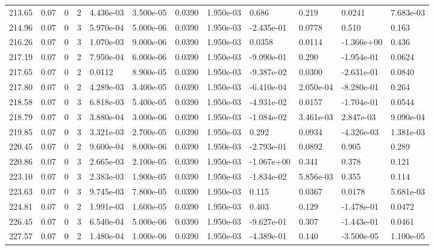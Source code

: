 \documentclass[preview]{standalone}
\begin{document}
{{{{{{{{\begin{tabular}{L{1.2cm}C{1.2cm} C{0.3cm}C{0.5cm} C{1.4cm}C{1.4cm} C{1.4cm}C{1.4cm} C{1.6cm}C{1.6cm} C{1.6cm}C{1.6cm}}
  213.65  &  0.07  & 0     &  2 &  4.436e-03  & 3.500e-05  &  0.0390&   1.950e-03& 0.686 & 0.219   &  0.0241 & 7.683e-03  \\ 
  214.96  &  0.07  & 0     &  3 &  5.970e-04  & 5.000e-06  &  0.0390&   1.950e-03& -2.435e-01 & 0.0778   &  0.510 & 0.163  \\ 
  216.26  &  0.07  & 0     &  3 &  1.070e-03  & 9.000e-06  &  0.0390&   1.950e-03& 0.0358 & 0.0114   &  -1.366e+00 & 0.436  \\ 
  217.19  &  0.07  & 0     &  2 &  7.950e-04  & 6.000e-06  &  0.0390&   1.950e-03& -9.090e-01 & 0.290   &  -1.954e-01 & 0.0624  \\ 
  217.65  &  0.07  & 0     &  2 &  0.0112  & 8.900e-05  &  0.0390&   1.950e-03& -9.387e-02 & 0.0300   &  -2.631e-01 & 0.0840  \\ 
  217.80  &  0.07  & 0     &  2 &  4.289e-03  & 3.400e-05  &  0.0390&   1.950e-03& -6.410e-04 & 2.050e-04   &  -8.280e-01 & 0.264  \\ 
  218.58  &  0.07  & 0     &  3 &  6.818e-03  & 5.400e-05  &  0.0390&   1.950e-03& -4.931e-02 & 0.0157   &  -1.704e-01 & 0.0544  \\ 
  218.79  &  0.07  & 0     &  3 &  3.880e-04  & 3.000e-06  &  0.0390&   1.950e-03& -1.084e-02 & 3.461e-03   &  2.847e-03 & 9.090e-04  \\ 
  219.85  &  0.07  & 0     &  3 &  3.321e-03  & 2.700e-05  &  0.0390&   1.950e-03& 0.292 & 0.0934   &  -4.326e-03 & 1.381e-03  \\ 
  220.45  &  0.07  & 0     &  2 &  9.600e-04  & 8.000e-06  &  0.0390&   1.950e-03& -2.793e-01 & 0.0892   &  0.905 & 0.289  \\ 
  220.86  &  0.07  & 0     &  3 &  2.665e-03  & 2.100e-05  &  0.0390&   1.950e-03& -1.067e+00 & 0.341   &  0.378 & 0.121  \\ 
  223.10  &  0.07  & 0     &  3 &  2.383e-03  & 1.900e-05  &  0.0390&   1.950e-03& -1.834e-02 & 5.856e-03   &  0.355 & 0.114  \\ 
  223.63  &  0.07  & 0     &  3 &  9.745e-03  & 7.800e-05  &  0.0390&   1.950e-03& 0.115 & 0.0367   &  0.0178 & 5.681e-03  \\ 
  224.81  &  0.07  & 0     &  2 &  1.991e-03  & 1.600e-05  &  0.0390&   1.950e-03& 0.403 & 0.129   &  -1.478e-01 & 0.0472  \\ 
  226.45  &  0.07  & 0     &  3 &  6.540e-04  & 5.000e-06  &  0.0390&   1.950e-03& -9.627e-01 & 0.307   &  -1.443e-01 & 0.0461  \\ 
  227.57  &  0.07  & 0     &  2 &  1.480e-04  & 1.000e-06  &  0.0390&   1.950e-03& -4.389e-01 & 0.140   &  -3.500e-05 & 1.100e-05  \\ 

\end{tabular}}}}}}}}}
\end{document}
